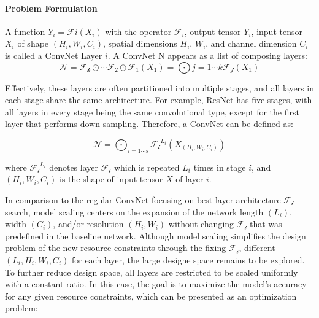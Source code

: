 \documentclass[
]{krantz}
\begin{document}
\hypertarget{problem-formulation}{%
\paragraph{Problem Formulation}\label{problem-formulation}}

A function \(Y_i = \mathcal{F}i \left( X_i \right)\) with the operator \(\mathcal{F}_i\), output tensor \(Y_i\), input tensor \(X_i\) of shape \(\left( H_i, W_i, C_i \right)\), spatial dimensions \(H_i\), \(W_i\), and channel dimension \(C_i\) is called a ConvNet Layer \(i\). A ConvNet N appears as a list of composing layers:
\begin{equation}
\tag{3}
\mathcal{N}=\mathcal{F_k}\odot \cdots \mathcal{F_2}\odot\mathcal{F_1}\left( X_1 \right)=\bigodot{j=1\cdots k}\mathcal{F_j}\left( X_1 \right)
\end{equation}

Effectively, these layers are often partitioned into multiple stages, and all layers in each stage share the same architecture. For example, ResNet has five stages, with all layers in every stage being the same convolutional type, except for the first layer that performs down-sampling. Therefore, a ConvNet can be defined as:

\begin{equation}
\tag{4}
 \mathcal{N}=\bigodot_{i=1\cdots s}\mathcal{F_i}^{L_i}\left( X_{\left( H_i, W_i, C_i  \right)} \right)
\end{equation}

where \(\mathcal{F_i}^{L_i}\) denotes layer \(\mathcal{F_i}\) which is repeated \(L_i\) times in stage \(i\), and \(\left( H_i, W_i, C_i \right)\) is the shape of input tensor \(X\) of layer \(i\).

In comparison to the regular ConvNet focusing on best layer architecture \(\mathcal{F_i}\) search, model scaling centers on the expansion of the network length \(\left( L_i\right)\), width \(\left( C_i \right)\), and/or resolution \(\left( H_i, W_i\right)\) without changing \(\mathcal{F_i}\) that was predefined in the baseline network. Although model scaling simplifies the design problem of the new resource constraints through the fixing \(\mathcal{F_i}\), different \(\left( L_i, H_i, W_i, C_i \right)\) for each layer, the large designe space remains to be explored. To further reduce design space, all layers are restricted to be scaled uniformly with a constant ratio. In this case, the goal is to maximize the model's accuracy for any given resource constraints, which can be presented as an optimization problem:
\end{document}
